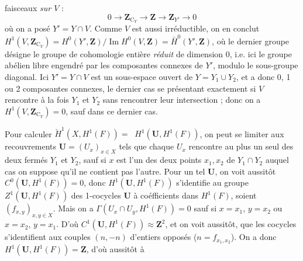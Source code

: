 faisceaux \emph{sur $V$} :
\[
0\to\mathbf Z_{\mathrm C_Y}\to\mathbf Z
\to\mathbf Z_{Y'}\to 0
\]
où on a posé $Y'=Y\cap V$. Comme $V$ est aussi irréductible, on en conclut
$H^1(V,\mathbf Z_{\mathrm C_Y})
=H^0(Y',\mathbf Z)/\operatorname{Im}H^0(V,\mathbf Z)
=\bar H^0(Y',\mathbf Z)$,
où le dernier groupe désigne le groupe de cohomologie entière \emph{réduit} de
dimension 0, i.e. ici le groupe abélien libre engendré par les composantes
connexes de $Y'$, modulo le sous-groupe diagonal.
Ici $Y'=Y\cap V$ est un sous-espace ouvert de $Y=Y_1\cup Y_2$, et a donc 0, 1
ou 2 composantes connexes, le dernier cas se présentant exactement si $V$
rencontre à la fois $Y_1$ et $Y_2$ sans rencontrer leur intersection ; donc on
a $H^1(V,\mathbf Z_{\mathrm C_Y})=0$, sauf dans ce dernier cas.

Pour calculer
$\check H^1(X,H^1(F))=\mathop{\underset{\to}{\lim}} H^1(\mathbf U,H^1(F))$,
on peut se limiter aux recouvrements $\mathbf U=(U_x)_{x\in X}$ tels que
chaque $U_x$ rencontre au plus un seul des deux fermés $Y_1$ et $Y_2$, sauf si
$x$ est l'un des deux points $x_1,x_2$ de $Y_1\cap Y_2$ auquel cas on suppose
qu'il ne contient pas l'autre.
Pour un tel $\mathbf U$, on voit aussitôt
$C^0(\mathbf U,H^1(F))=0$, donc $H^1(\mathbf U,H^1(F))$ s'identifie au groupe
$Z^1(\mathbf U,H^1(F))$ des 1-cocycles $\mathbf U$ à coéfficients dans
$H^1(F)$, soient $(f_{x,y})_{x,y\in X}$.
Mais on a
$\Gamma(U_x\cap U_y,H^1(F))=0$
sauf si $x=x_1$, $y=x_2$ ou $x=x_2$, $y=x_1$. D'où
$C^1(\mathbf U,H^1(F))\approx\mathbf Z^2$,
et on voit aussitôt, que les cocycles s'identifient aux couples $(n,-n)$
d'entiers opposés ($n=f_{x_1,x_2}$).
On a donc $H^1(\mathbf U,H^1(F))=\mathbf Z$, d'où aussitôt à

